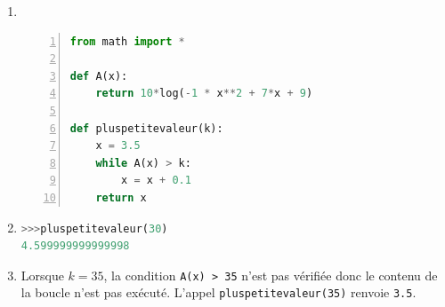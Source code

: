 \begin{enumerate}
	\item \ {} 
	
\begin{center}
\begin{lstlisting}[language=python,frame=single, escapechar=|, numbers=left]
from math import *	

def A(x):
	return 10*log(-1 * x**2 + 7*x + 9)
	
def pluspetitevaleur(k):
	x = 3.5
	while A(x) > k:
		x = x + 0.1
	return x	

\end{lstlisting}
\end{center}
	
	\item
	\begin{lstlisting}[language=python]
>>>pluspetitevaleur(30)
4.599999999999998
\end{lstlisting}
	
	\item Lorsque $k=35$, la condition \verb!A(x) > 35! n'est pas vérifiée donc le contenu de la boucle n'est pas exécuté. L'appel \verb!pluspetitevaleur(35)! renvoie \verb!3.5!.
\end{enumerate}
